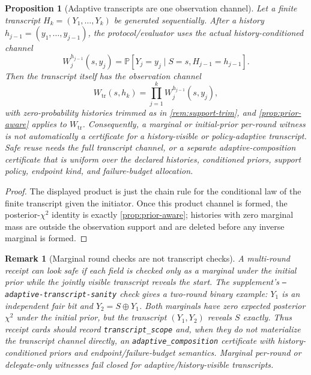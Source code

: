 \documentclass[11pt]{article}
\newtheorem{proposition}[theorem]{Proposition}
\newtheorem{remark}[theorem]{Remark}
\newcommand{\Prb}{\mathbb{P}}
\begin{document}
\begin{proposition}[Adaptive transcripts are one observation channel]\label{prop:adaptive-transcript}
Let a finite transcript $H_k=(Y_1,\ldots,Y_k)$ be generated sequentially.  After a
history $h_{j-1}=(y_1,\ldots,y_{j-1})$, the protocol/evaluator uses the actual
history-conditioned channel
\[
  W_j^{h_{j-1}}(s,y_j)=\Prb[Y_j=y_j\mid S=s,H_{j-1}=h_{j-1}].
\]
Then the transcript itself has the observation channel
\[
  W_{\mathrm{tr}}(s,h_k)=\prod_{j=1}^k W_j^{h_{j-1}}(s,y_j),
\]
with zero-probability histories trimmed as in \cref{rem:support-trim}, and
\cref{prop:prior-aware} applies to $W_{\mathrm{tr}}$.  Consequently, a marginal
or initial-prior per-round witness is not automatically a certificate for a
history-visible or policy-adaptive transcript.  Safe reuse needs the full
transcript channel, or a separate adaptive-composition certificate that is
uniform over the declared histories, conditioned priors, support policy, endpoint
kind, and failure-budget allocation.
\end{proposition}
\begin{proof}
The displayed product is just the chain rule for the conditional law of the
finite transcript given the initiator.  Once this product channel is formed, the
posterior-$\chi^2$ identity is exactly \cref{prop:prior-aware}; histories with
zero marginal mass are outside the observation support and are deleted before any
inverse marginal is formed.
\end{proof}

\begin{remark}[Marginal round checks are not transcript checks]\label{rem:adaptive-transcript}
A multi-round receipt can look safe if each field is checked only as a marginal
under the initial prior while the jointly visible transcript reveals the start.
The supplement's \texttt{--adaptive-transcript-sanity} check gives a two-round
binary example: $Y_1$ is an independent fair bit and $Y_2=S\oplus Y_1$.  Both
marginals have zero expected posterior $\chi^2$ under the initial prior, but the
transcript $(Y_1,Y_2)$ reveals $S$ exactly.  Thus receipt cards should record
\texttt{transcript\_scope} and, when they do not materialize the transcript
channel directly, an \texttt{adaptive\_composition} certificate with
history-conditioned priors and endpoint/failure-budget semantics.  Marginal
per-round or delegate-only witnesses fail closed for adaptive/history-visible
transcripts.
\end{remark}
\end{document}
